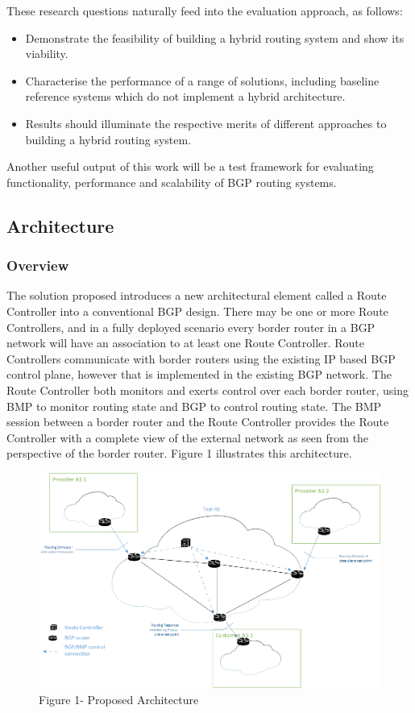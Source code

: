 These research questions naturally feed into the evaluation approach, as follows:

\begin{itemize}
	\item Demonstrate the feasibility of building a hybrid routing system and show its viability.
	\item Characterise the performance of a range of solutions, including baseline reference systems which do not implement a hybrid architecture.
	\item Results should illuminate the respective merits of different approaches to building a hybrid routing system.
\end{itemize}
Another useful output of this work will be a test framework for evaluating functionality, performance and scalability of BGP routing systems.

\subsection{Architecture}

\subsubsection{Overview}

The solution proposed introduces a new architectural element called a Route Controller into a conventional BGP design. There may be one or more Route Controllers, and in a fully deployed scenario every border router in a BGP network will have an association to at least one Route Controller. Route Controllers communicate with border routers using the existing IP based BGP control plane, however that is implemented in the existing BGP network. The Route Controller both monitors and exerts control over each border router, using BMP to monitor routing state and BGP to control routing state. The BMP session between a border router and the Route Controller provides the Route Controller with a complete view of the external network as seen from the perspective of the border router. Figure 1 illustrates this architecture.

\begin{figure}
	\centering
	\includegraphics[width=0.5\linewidth]{images/simulated test network 1.1.png}
	\caption{Figure 1- Proposed Architecture}
	\label{fig:enter-label}
\end{figure}

